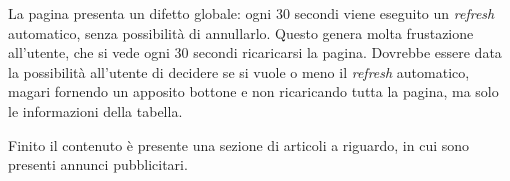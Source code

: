La pagina presenta un difetto globale: ogni 30 secondi viene eseguito un
\textit{refresh} automatico, senza possibilità di annullarlo. Questo genera
molta frustazione all'utente, che si vede ogni 30 secondi ricaricarsi la pagina.
Dovrebbe essere data la possibilità all'utente di decidere se si vuole o meno
il \textit{refresh} automatico, magari fornendo un apposito bottone e non
ricaricando tutta la pagina, ma solo le informazioni della tabella.

Finito il contenuto è presente una sezione di articoli a riguardo, in cui sono
presenti annunci pubblicitari.

